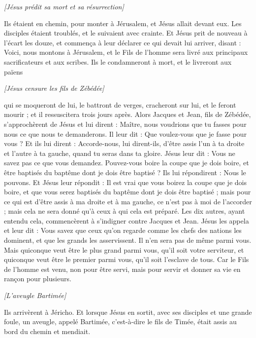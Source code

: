 \begin{multicols}{2}
\begin{center}
\textit{[Jésus prédit sa mort et sa résurrection]}
\end{center}
\PPE{}
Ils étaient en chemin, pour monter à Jérusalem, et Jésus allait devant eux. Les disciples étaient troublés, et le suivaient avec crainte. Et Jésus prit de nouveau à l'écart les douze, et commença à leur déclarer ce qui devait lui arriver,
disant : Voici, nous montons à Jérusalem, et le Fils de l'homme sera livré aux principaux sacrificateurs et aux scribes. Ils le condamneront à mort, et le livreront aux païens
\begin{center}
\textit{[Jésus censure les fils de Zébédée]}
\end{center}
\PPE{}
qui se moqueront de lui, le battront de verges, cracheront sur lui, et le feront mourir ; et il ressuscitera trois jours après.
Alors Jacques et Jean, fils de Zébédée, s’approchèrent de Jésus et lui dirent : Maître, nous voudrions que tu fasses pour nous ce que nous te demanderons.
Il leur dit : Que voulez-vous que je fasse pour vous ?
Et ils lui dirent : Accorde-nous, lui dirent-ils, d’être assis l’un à ta droite et l’autre à ta gauche, quand tu seras dans ta gloire.
Jésus leur dit : Vous ne savez pas ce que vous demandez. Pouvez-vous boire la coupe que je dois boire, et être baptisés du baptême dont je dois être baptisé ?
Ils lui répondirent : Nous le pouvons. Et Jésus leur répondit : Il est vrai que vous boirez la coupe que je dois boire, et que vous serez baptisés du baptême dont je dois être baptisé ;
mais pour ce qui est d'être assis à ma droite et à ma gauche, ce n'est pas à moi de l’accorder ; mais cela ne sera donné qu’à ceux à qui cela est préparé.
Les dix autres, ayant entendu cela, commencèrent à s’indigner contre Jacques et Jean.
Jésus les appela et leur dit : Vous savez que ceux qu’on regarde comme les chefs des nations les dominent, et que les grands les asservissent.
Il n'en sera pas de même parmi vous. Mais quiconque veut être le plus grand parmi vous, qu’il soit votre serviteur,
et quiconque veut être le premier parmi vous, qu’il soit l’esclave de tous.
Car le Fils de l'homme est venu, non pour être servi, mais pour servir et donner sa vie en rançon pour plusieurs.
\begin{center}
\textit{[L'aveugle Bartimée]}
\end{center}
\PPE{}
Ils arrivèrent à Jéricho. Et lorsque Jésus en sortit, avec ses disciples et une grande foule, un aveugle, appelé Bartimée, c'est-à-dire le fils de Timée, était assis au bord du chemin et mendiait.

\end{multicols}
